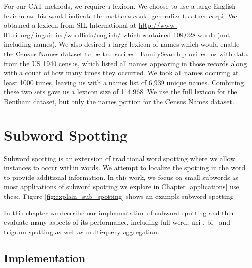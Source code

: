 \documentclass[ms,electronic,twosidetoc,letterpaper,chaptercenter,parttop,lol,lof,lot]{byumsphd}
\begin{document}
For our CAT methods, we require a lexicon. We choose to use a large English lexicon as this would indicate the methods could generalize to other corpi. We obtained a lexicon from SIL International at \url{http://www-01.sil.org/linguistics/wordlists/english/} which contained 108,028 words (not including names). We also desired a large lexicon of names which would enable the Census Names dataset to be transcribed. FamilySearch provided us with data from the US 1940 census, which listed all names appearing in those records along with a count of how many times they occurred. We took all names occuring at least 1000 times, leaving us with a names list of 6,939 unique names. Combining these two sets gave us a lexicon size of 114,968. We use the full lexicon for the Bentham dataset, but only the names portion for the Census Names dataset.

\chapter{Subword Spotting}\label{subwordspotting}

Subword spotting is an extension of traditional word spotting where we allow instances to occur within words. We attempt to localize the spotting in the word to provide additional information. In this work, we focus on small subwords as most applications of subword spotting we explore in Chapter \ref{applications} use these. Figure \ref{fig:explain_sub_spotting} shows an example subword spotting.

In this chapter we describe our implementation of subword spotting and then evaluate many aspects of its performance, including full word, uni-, bi-, and trigram spotting as well as multi-query aggregation.


\section{Implementation}
\end{document}
